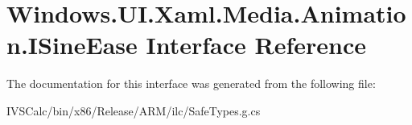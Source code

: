 \hypertarget{interface_windows_1_1_u_i_1_1_xaml_1_1_media_1_1_animation_1_1_i_sine_ease}{}\section{Windows.\+U\+I.\+Xaml.\+Media.\+Animation.\+I\+Sine\+Ease Interface Reference}
\label{interface_windows_1_1_u_i_1_1_xaml_1_1_media_1_1_animation_1_1_i_sine_ease}


The documentation for this interface was generated from the following file\+:\begin{DoxyCompactItemize}
\item 
I\+V\+S\+Calc/bin/x86/\+Release/\+A\+R\+M/ilc/Safe\+Types.\+g.\+cs\end{DoxyCompactItemize}
